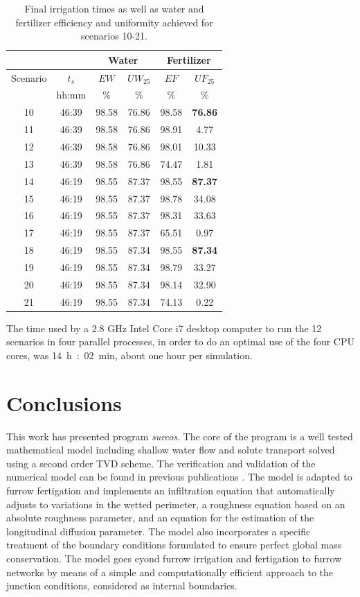 \documentclass[review,authoryear]{elsarticle}
\begin{document}
\begin{table}[ht!]
\centering
\caption{Final irrigation times as well as water and fertilizer
efficiency and uniformity achieved for scenarios 10-21.\label{TabFurrowNetwork}}
\footnotesize
\begin{tabular}{|c|c|cc|cc|}
\hline
&&\multicolumn{2}{|c|}{Water}&\multicolumn{2}{|c|}{Fertilizer}\\
\hline
Scenario&$t_s$&$EW$&$UW_{25}$&$EF$&$UF_{25}$\\
&hh:mm&\%&\%&\%&\%\\
\hline
10&46:39&98.58&76.86&98.58&\bf 76.86\\
11&46:39&98.58&76.86&98.91&4.77\\
12&46:39&98.58&76.86&98.01&10.33\\
13&46:39&98.58&76.86&74.47&1.81\\
14&46:19&98.55&87.37&98.55&\bf 87.37\\
15&46:19&98.55&87.37&98.78&34.08\\
16&46:19&98.55&87.37&98.31&33.63\\
17&46:19&98.55&87.37&65.51&0.97\\
18&46:19&98.55&87.34&98.55&\bf 87.34\\
19&46:19&98.55&87.34&98.79&33.27\\
20&46:19&98.55&87.34&98.14&32.90\\
21&46:19&98.55&87.34&74.13&0.22\\
\hline
\end{tabular}
\end{table}

The time used by a 2.8 GHz Intel Core i7 desktop computer to run the 12
scenarios in four parallel processes, in order to do an optimal use of the four
CPU cores, was 14~h~:~02~min, about one hour per simulation.

\section{Conclusions}

This work has presented program \emph{surcos}. The core of the program is a well
tested mathematical model including shallow water flow and solute transport
solved using a second order TVD scheme. The verification and validation of the
numerical model can be found in previous publications
\citep{JaviSurcos1,JaviSurcos2}. The model is adapted to furrow fertigation and
implements an infiltration equation that automatically adjusts to variations in
the wetted perimeter, a roughness equation based on an absolute roughness
parameter, and an equation for the estimation of the longitudinal diffusion
parameter. The model also incorporates a specific treatment of the boundary
conditions formulated to ensure perfect global mass conservation. The model goes
eyond furrow irrigation and fertigation to furrow networks by means of a simple
and computationally efficient approach to the junction conditions, considered as
internal boundaries.
\end{document}
